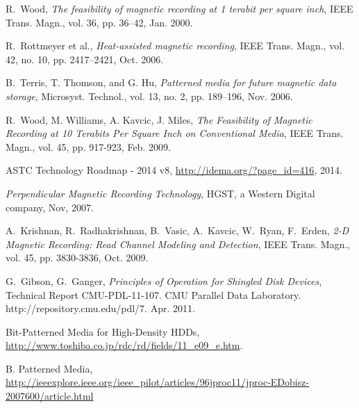 \begin{thebibliography}{1}

R.~Wood, \emph{The feasibility of magnetic recording at 1 terabit per square
inch}, IEEE Trans. Magn., vol. 36, pp. 36–42, Jan. 2000.

R.~Rottmeyer et al., \emph{Heat-assisted magnetic recording}, IEEE Trans.
Magn., vol. 42, no. 10, pp. 2417–2421, Oct. 2006.

B.~Terris, T. Thomson, and G. Hu, \emph{Patterned media for future magnetic
data storage}, Microsyst. Technol., vol. 13, no. 2, pp. 189–196, Nov.
2006.

R.~Wood, M. Williams, A. Kavcic, J. Miles, \emph{The Feasibility of Magnetic Recording at 10 Terabits Per Square Inch on Conventional Media}, IEEE Trans. Magn., vol. 45, pp. 917-923, Feb. 2009.

ASTC Technology Roadmap - 2014 v8, \url{http://idema.org/?page_id=416}, 2014.

\emph{Perpendicular Magnetic Recording Technology}, HGST, a Western Digital company, Nov, 2007.

A.~Krishnan, R.~Radhakrishnan, B.~Vasic, A.~Kavcic, W.~Ryan, F.~Erden,
\emph{2-D Magnetic Recording: Read Channel Modeling and Detection}, IEEE Trans. Magn., vol. 45, pp. 3830-3836, Oct. 2009.


G.~Gibson, G.~Ganger, 
\emph{Principles of Operation for Shingled Disk Devices}, Technical Report
CMU-PDL-11-107. CMU Parallel Data Laboratory. http://repository.cmu.edu/pdl/7. Apr. 2011.

Bit-Patterned Media for High-Density HDDs, \url{http://www.toshiba.co.jp/rdc/rd/fields/11_e09_e.htm}.

B. Patterned Media, \url{http://ieeexplore.ieee.org/ieee_pilot/articles/96jproc11/jproc-EDobisz-2007600/article.html}


\end{thebibliography}
